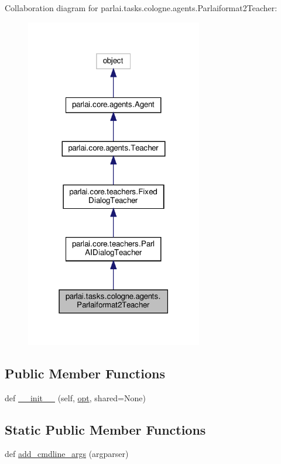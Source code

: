 Collaboration diagram for parlai.\+tasks.\+cologne.\+agents.\+Parlaiformat2\+Teacher\+:
\nopagebreak
\begin{figure}[H]
\begin{center}
\leavevmode
\includegraphics[width=219pt]{classparlai_1_1tasks_1_1cologne_1_1agents_1_1Parlaiformat2Teacher__coll__graph}
\end{center}
\end{figure}
\subsection*{Public Member Functions}
\begin{DoxyCompactItemize}
\item 
def \hyperlink{classparlai_1_1tasks_1_1cologne_1_1agents_1_1Parlaiformat2Teacher_a6e9079898209456df94741e7780aa0c7}{\+\_\+\+\_\+init\+\_\+\+\_\+} (self, \hyperlink{classparlai_1_1core_1_1agents_1_1Teacher_a3ce6243860ce978a897922863ed32fa4}{opt}, shared=None)
\end{DoxyCompactItemize}
\subsection*{Static Public Member Functions}
\begin{DoxyCompactItemize}
\item 
def \hyperlink{classparlai_1_1tasks_1_1cologne_1_1agents_1_1Parlaiformat2Teacher_a71d2157bd6c642aeb4f26f04c33941ed}{add\+\_\+cmdline\+\_\+args} (argparser)
\end{DoxyCompactItemize}
